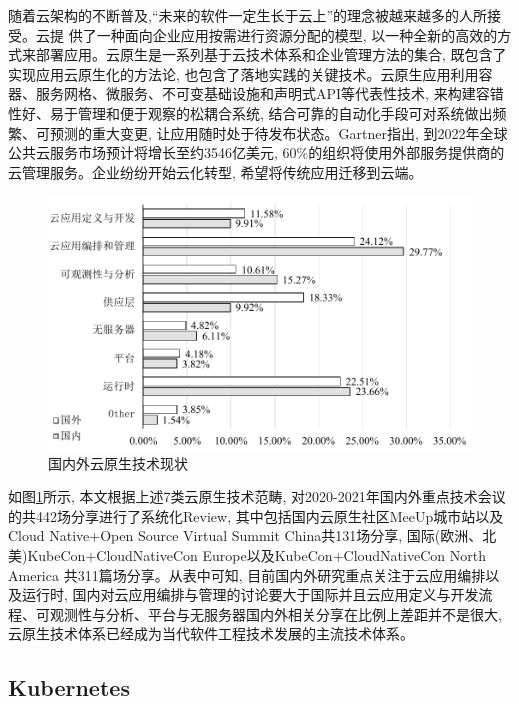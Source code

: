 随着云架构的不断普及,“未来的软件一定生长于云上”的理念被越来越多的人所接受。云提
供了一种面向企业应用按需进行资源分配的模型, 以一种全新的高效的方式来部署应用。云原生是一系列基于云技术体系和企业管理方法的集合, 既包含了实现应用云原生化的方法论, 也包含了落地实践的关键技术。云原生应用利用容器、服务网格、微服务、不可变基础设施和声明式API等代表性技术, 来构建容错性好、易于管理和便于观察的松耦合系统, 结合可靠的自动化手段可对系统做出频繁、可预测的重大变更, 让应用随时处于待发布状态。Gartner指出, 到2022年全球公共云服务市场预计将增长至约3546亿美元, 60\%的组织将使用外部服务提供商的云管理服务\cite{bhagavan2020achieving}。企业纷纷开始云化转型, 希望将传统应用迁移到云端。

\begin{figure}[h] %
    \centering %
    \includegraphics[width=0.9 \textwidth]{FIGs/chapter2/workshop.pdf} %
    \caption{国内外云原生技术现状} %
    \label{workshop} %
\end{figure}%

如图\ref{workshop}所示, 本文根据上述7类云原生技术范畴, 对2020-2021年国内外重点技术会议的共442场分享进行了系统化Review, 其中包括国内云原生社区MeeUp城市站以及Cloud Native+Open Source Virtual Summit China共131场分享, 国际(欧洲、北美)KubeCon+CloudNativeCon Europe以及KubeCon+CloudNativeCon North America 共311篇场分享。从表中可知, 目前国内外研究重点关注于云应用编排以及运行时, 国内对云应用编排与管理的讨论要大于国际并且云应用定义与开发流程、可观测性与分析、平台与无服务器国内外相关分享在比例上差距并不是很大, 云原生技术体系已经成为当代软件工程技术发展的主流技术体系。

\subsection{Kubernetes}

